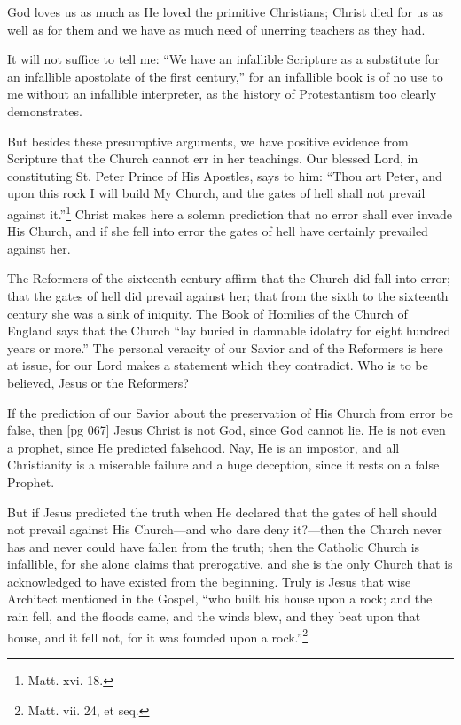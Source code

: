 God loves us as much as He loved the primitive
Christians; Christ died for us as well as for them
and we have as much need of unerring teachers
as they had.

It will not suffice to tell me: “We have an infallible
Scripture as a substitute for an infallible
apostolate of the first century,” for an infallible
book is of no use to me without an infallible interpreter,
as the history of Protestantism too
clearly demonstrates.

But besides these presumptive arguments, we
have positive evidence from Scripture that the
Church cannot err in her teachings. Our blessed
Lord, in constituting St. Peter Prince of His
Apostles, says to him: “Thou art Peter, and upon
this rock I will build My Church, and the gates
of hell shall not prevail against it.”\footnote{Matt. xvi. 18.}
Christ makes here a solemn prediction that no error
shall ever invade His Church, and if she fell into
error the gates of hell have certainly prevailed
against her.

The Reformers of the sixteenth century affirm
that the Church did fall into error; that the gates
of hell did prevail against her; that from the
sixth to the sixteenth century she was a sink of
iniquity. The Book of Homilies of the Church of
England says that the Church “lay buried in
damnable idolatry for eight hundred years or
more.” The personal veracity of our Savior and
of the Reformers is here at issue, for our Lord
makes a statement which they contradict. Who
is to be believed, Jesus or the Reformers?

If the prediction of our Savior about the preservation
of His Church from error be false, then
[pg 067]
Jesus Christ is not God, since God cannot lie.
He is not even a prophet, since He predicted
falsehood. Nay, He is an impostor, and all Christianity
is a miserable failure and a huge deception,
since it rests on a false Prophet.

But if Jesus predicted the truth when He declared
that the gates of hell should not prevail
against His Church—and who dare deny it?—then
the Church never has and never could have
fallen from the truth; then the Catholic Church
is infallible, for she alone claims that prerogative,
and she is the only Church that is acknowledged
to have existed from the beginning. Truly is
Jesus that wise Architect mentioned in the Gospel,
“who built his house upon a rock; and the
rain fell, and the floods came, and the winds blew,
and they beat upon that house, and it fell not,
for it was founded upon a rock.”\footnote{Matt. vii. 24, et seq.}

